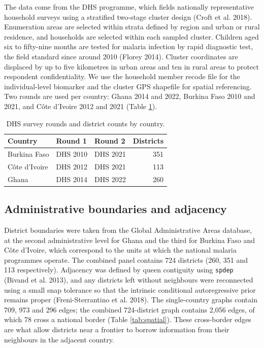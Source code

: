 \documentclass{article}
\begin{document}
The data come from the DHS programme, which fields nationally
representative household surveys using a stratified two-stage cluster
design ({Croft et al.} 2018). Enumeration areas are selected within
strata defined by region and urban or rural residence, and households
are selected within each sampled cluster. Children aged six to
fifty-nine months are tested for malaria infection by rapid diagnostic
test, the field standard since around 2010 (Florey 2014). Cluster
coordinates are displaced by up to five kilometres in urban areas and
ten in rural areas to protect respondent confidentiality. We use the
household member recode file for the individual-level biomarker and the
cluster GPS shapefile for spatial referencing. Two rounds are used per
country: Ghana 2014 and 2022, Burkina Faso 2010 and 2021, and Côte
d'Ivoire 2012 and 2021 (Table \ref{tab:surveys}).

\begin{longtable}[t]{lllr}
\caption{\label{tab:surveys}\label{tab:surveys}DHS survey rounds and district counts by country.}\\
\toprule
Country & Round 1 & Round 2 & Districts\\
\midrule
Burkina Faso & DHS 2010 & DHS 2021 & 351\\
Côte d'Ivoire & DHS 2012 & DHS 2021 & 113\\
Ghana & DHS 2014 & DHS 2022 & 260\\
\bottomrule
\end{longtable}

\subsection{Administrative boundaries and
adjacency}\label{administrative-boundaries-and-adjacency}

District boundaries were taken from the Global Administrative Areas
database, at the second administrative level for Ghana and the third for
Burkina Faso and Côte d'Ivoire, which correspond to the units at which
the national malaria programmes operate. The combined panel contains 724
districts (260, 351 and 113 respectively). Adjacency was defined by
queen contiguity using \texttt{spdep} (Bivand et al. 2013), and any
districts left without neighbours were reconnected using a small snap
tolerance so that the intrinsic conditional autoregressive prior remains
proper (Freni-Sterrantino et al. 2018). The single-country graphs
contain 709, 973 and 296 edges; the combined 724-district graph contains
2,056 edges, of which 78 cross a national border (Table
\ref{tab:spatial}). These cross-border edges are what allow districts
near a frontier to borrow information from their neighbours in the
adjacent country.
\end{document}
